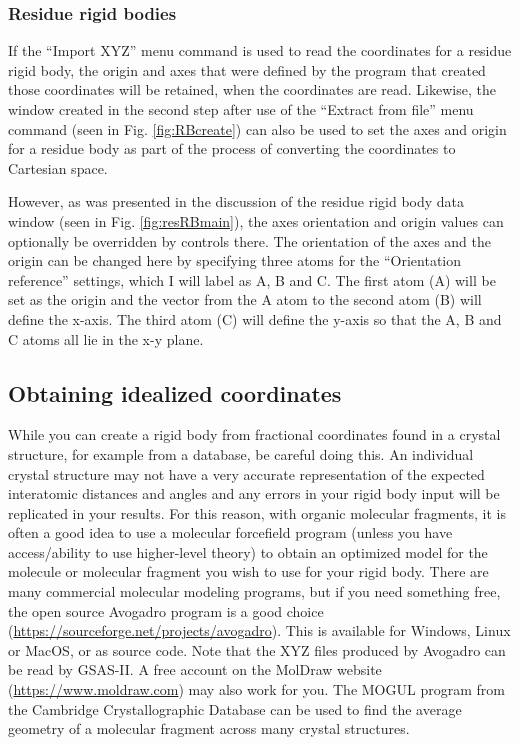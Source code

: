 \subsubsection{Residue rigid bodies}
If the ``Import XYZ'' menu command is used to read the coordinates for a residue rigid body, the origin and axes that were defined by the program that created those coordinates will be retained, when the coordinates are read. Likewise, the window created in the second step after use of the ``Extract from file'' menu command (seen in Fig. \ref{fig:RBcreate}) can also be used to set the axes and origin for a residue body as part of the process of converting the coordinates to Cartesian space. 

However, as was presented in the discussion of the residue rigid body data window (seen in Fig. \ref{fig:resRBmain}), the axes orientation and origin values can optionally be overridden by controls there. 
The orientation of the axes and the origin can be changed here by specifying three atoms for the ``Orientation reference'' settings, which I will label as A, B and C. 
The first atom (A) will be set as the origin and the vector from the A atom to the second atom (B) will define the x-axis. 
The third atom (C) will define the y-axis so that the A, B and C atoms all lie in the x-y plane. 

\subsection{Obtaining idealized coordinates}\label{idealizedXYZ}
While you can create a rigid body from fractional coordinates found in a crystal structure, for example from a database, be careful doing this. An individual crystal structure may not have a very accurate representation of the expected interatomic distances and angles and any errors in your rigid body input will be replicated in your results. For this reason, with organic molecular fragments, it is often a good idea to use a molecular forcefield program (unless you have access/ability to use higher-level theory) to obtain an optimized model for the molecule or molecular fragment you wish to use for your rigid body. There are many commercial molecular modeling programs, but if you need something free, the open source Avogadro program is a good choice  (\url{https://sourceforge.net/projects/avogadro}). This is available for Windows, Linux or MacOS, or as source code. Note that the XYZ files produced by Avogadro can be read by GSAS-II. A free account on the MolDraw website (\url{https://www.moldraw.com}) may also work for you. The MOGUL program from the Cambridge Crystallographic Database can be used to find the average geometry of a molecular fragment across many crystal structures. 

